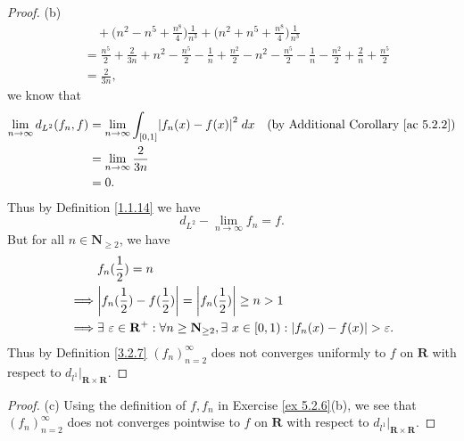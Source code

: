 \begin{proof}{(b)}
\begin{align*}
         & \quad + \bigg(n^2 - n^5 + \frac{n^8}{4}\bigg) \frac{1}{n^3} + \bigg(n^2 + n^5 + \frac{n^8}{4}\bigg) \frac{1}{n^3}                                                                                                                                                                                 \\
         & = \frac{n^5}{2} + \frac{2}{3n} + n^2 - \frac{n^5}{2} - \frac{1}{n} + \frac{n^2}{2} - n^2 - \frac{n^5}{2} - \frac{1}{n} - \frac{n^2}{2} + \frac{2}{n} + \frac{n^5}{2}                                                                                                                              \\
         & = \frac{2}{3n},
    \end{align*}
    we know that
    \begin{align*}
        \lim_{n \to \infty} d_{L^2}(f_n, f) & = \lim_{n \to \infty} \int_{[0, 1]} \abs*{f_n(x) - f(x)}^2 \; dx & \text{(by Additional Corollary \ref{ac 5.2.2})} \\
                                            & = \lim_{n \to \infty} \frac{2}{3n}                                                                                 \\
                                            & = 0.
    \end{align*}
    Thus by Definition \ref{1.1.14} we have
    \[
        d_{L^2} - \lim_{n \to \infty} f_n = f.
    \]
    But for all \(n \in \mathbf{N}_{\geq 2}\), we have
    \begin{align*}
                 & f_n(\frac{1}{2}) = n                                                                                                                    \\
        \implies & \abs*{f_n(\frac{1}{2}) - f(\frac{1}{2})} = \abs*{f_n(\frac{1}{2})} \geq n > 1                                                           \\
        \implies & \exists\ \varepsilon \in \mathbf{R}^+ : \forall n \geq \mathbf{N}_{\geq 2}, \exists\ x \in [0, 1) : \abs*{f_n(x) - f(x)} > \varepsilon.
    \end{align*}
    Thus by Definition \ref{3.2.7} \((f_n)_{n = 2}^\infty\) does not converges uniformly to \(f\) on \(\mathbf{R}\) with respect to \(d_{l^1}|_{\mathbf{R} \times \mathbf{R}}\).
\end{proof}

\begin{proof}{(c)}
    Using the definition of \(f, f_n\) in Exercise \ref{ex 5.2.6}(b), we see that \((f_n)_{n = 2}^\infty\) does not converges pointwise to \(f\) on \(\mathbf{R}\) with respect to \(d_{l^1}|_{\mathbf{R} \times \mathbf{R}}\).
\end{proof}

